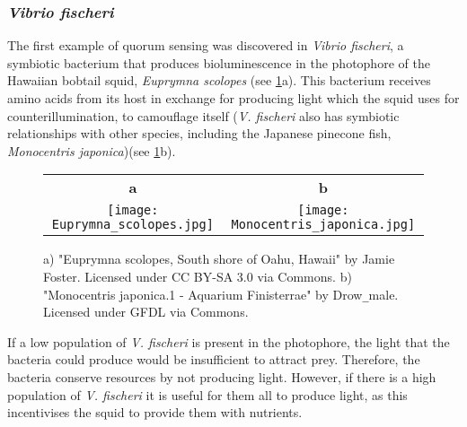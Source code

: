 \subsubsection{\textit{Vibrio fischeri}}

The first example of quorum sensing was discovered in \textit{Vibrio fischeri}, a symbiotic bacterium that produces bioluminescence in the photophore of the Hawaiian bobtail squid, \textit{Euprymna scolopes} \cite{Nealson1970,Miller2001,Visick2006} (see \ref{fgr:ES+MJ}a). This bacterium receives amino acids\cite{Graf1998, Lemus2000} from its host in exchange for producing light which the squid uses for counterillumination, to camouflage itself\cite{Jones2004} (\textit{V. fischeri} also has symbiotic relationships with other species, including the Japanese pinecone fish, \textit{Monocentris japonica}\cite{Ruby1976})(see \ref{fgr:ES+MJ}b). 

\begin{figure}[H]
	\begin{center}
		\begin{tabular}{cc}
	    	\textbf{a} & \textbf{b}\\
			\texttt{[image: Euprymna\_scolopes.jpg]} & \texttt{[image: Monocentris\_japonica.jpg]} \\
			
		\end{tabular}	
		
		\caption{a) "Euprymna scolopes, South shore of Oahu, Hawaii" by Jamie Foster. Licensed under CC BY-SA 3.0 via Commons. 
		b) "Monocentris japonica.1 - Aquarium Finisterrae" by Drow\texttt{\_}male. Licensed under GFDL via Commons. \label{fgr:ES+MJ}}
		
	\end{center}
\end{figure}


If a low population  of \textit{V. fischeri} is  present  in  the  photophore,  the  light  that the bacteria could produce would  be insufficient to  attract prey. Therefore, the bacteria conserve resources by not producing light.
However, if there is a high population of \textit{V. fischeri} it is useful for them all to produce light, as this incentivises the squid to provide them with nutrients. 


